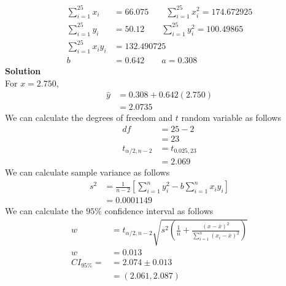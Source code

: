 \documentclass{uofa-eng-assignment}
\begin{document}
\begin{enumerate}
\begin{align*}
            \sum_{i=1}^{25}x_i    & = 66.075 \qquad \sum_{i=1}^{25}x_i^2 = 174.672925 \\
            \sum_{i=1}^{25}y_i    & = 50.12 \qquad \sum_{i=1}^{25}y_i^2 = 100.49865   \\
            \sum_{i=1}^{25}x_iy_i & = 132.490725                                      \\
            b                     & = 0.642 \qquad a = 0.308
        \end{align*}
        \textbf{Solution} \\
        For $x = 2.750$,
        \begin{align*}
            \hat{y} & = 0.308 + 0.642(2.750) \\
                    & = 2.0735
        \end{align*}
        We can calculate the degrees of freedom and $t$ random variable as follows
        \begin{align*}
            df                & = 25 - 2        \\
                              & = 23            \\
            t_{\alpha/2, n-2} & = t_{0.025, 23} \\
                              & = 2.069
        \end{align*}
        We can calculate sample variance as follows
        \begin{align*}
            s^2 & = \frac{1}{n-2}\left[\sum_{i=1}^{n}y_i^2 - b\sum_{i=1}^{n}x_iy_i\right] \\
                & = 0.0001149
        \end{align*}
        We can calculate the $95\%$ confidence interval as follows
        \begin{align*}
            w           & = t_{\alpha/2, n-2}\sqrt{s^2\left(\frac{1}{n} + \frac{(x - \bar{x})^2}{\sum_{i=1}^{n}(x_i - \bar{x})^2}\right)} \\
            w           & = 0.013                                                                                                         \\
            CI_{95\%} = & = 2.074 \pm 0.013                                                                                               \\
                        & = (2.061, 2.087)
        \end{align*}

\end{enumerate}
\end{document}
